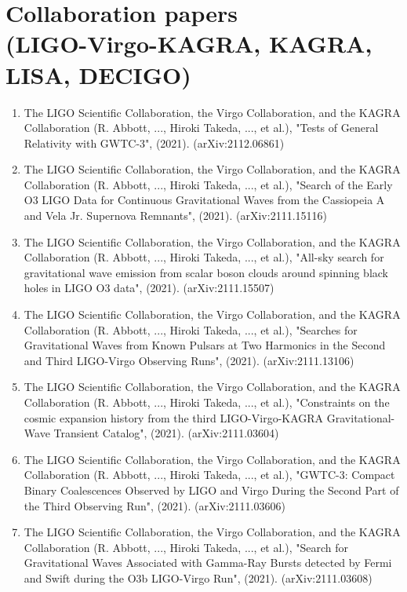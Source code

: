 \documentclass[12pt,a4paper]{article}
\begin{document}
\section*{Collaboration papers \\(LIGO-Virgo-KAGRA, KAGRA, LISA, DECIGO)}
\begin{enumerate}

\item The LIGO Scientific Collaboration, the Virgo Collaboration, and the KAGRA Collaboration (R. Abbott, ..., Hiroki Takeda, ..., et al.), "Tests of General Relativity with GWTC-3", (2021). (arXiv:2112.06861)

\item The LIGO Scientific Collaboration, the Virgo Collaboration, and the KAGRA Collaboration (R. Abbott, ..., Hiroki Takeda, ..., et al.), "Search of the Early O3 LIGO Data for Continuous Gravitational Waves from the Cassiopeia A and Vela Jr. Supernova Remnants", (2021). (arXiv:2111.15116)

\item The LIGO Scientific Collaboration, the Virgo Collaboration, and the KAGRA Collaboration (R. Abbott, ..., Hiroki Takeda, ..., et al.), "All-sky search for gravitational wave emission from scalar boson clouds around spinning black holes in LIGO O3 data", (2021). (arXiv:2111.15507)

\item The LIGO Scientific Collaboration, the Virgo Collaboration, and the KAGRA Collaboration (R. Abbott, ..., Hiroki Takeda, ..., et al.), "Searches for Gravitational Waves from Known Pulsars at Two Harmonics in the Second and Third LIGO-Virgo Observing Runs", (2021). (arXiv:2111.13106)



\item The LIGO Scientific Collaboration, the Virgo Collaboration, and the KAGRA Collaboration (R. Abbott, ..., Hiroki Takeda, ..., et al.), "Constraints on the cosmic expansion history from the third LIGO-Virgo-KAGRA Gravitational-Wave Transient Catalog", (2021). (arXiv:2111.03604)

\item The LIGO Scientific Collaboration, the Virgo Collaboration, and the KAGRA Collaboration (R. Abbott, ..., Hiroki Takeda, ..., et al.), "GWTC-3: Compact Binary Coalescences Observed by LIGO and Virgo During the Second Part of the Third Observing Run", (2021). (arXiv:2111.03606)

\item The LIGO Scientific Collaboration, the Virgo Collaboration, and the KAGRA Collaboration (R. Abbott, ..., Hiroki Takeda, ..., et al.), "Search for Gravitational Waves Associated with Gamma-Ray Bursts detected by Fermi and Swift during the O3b LIGO-Virgo Run", (2021). (arXiv:2111.03608) 


\end{enumerate}
\end{document}
